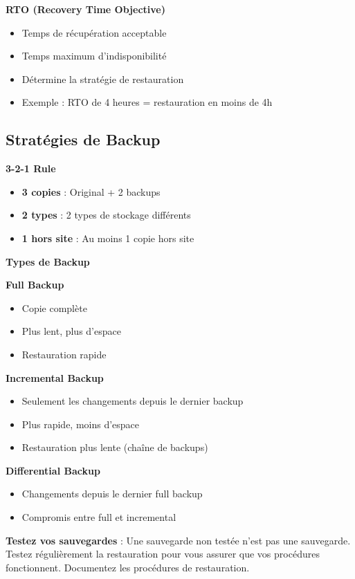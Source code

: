 \documentclass[11pt,a4paper]{article}
\begin{document}
\textbf{RTO (Recovery Time Objective)}
\begin{itemize}
    \item Temps de récupération acceptable
    \item Temps maximum d'indisponibilité
    \item Détermine la stratégie de restauration
    \item Exemple : RTO de 4 heures = restauration en moins de 4h
\end{itemize}

\subsection{Stratégies de Backup}

\textbf{3-2-1 Rule}
\begin{itemize}
    \item \textbf{3 copies} : Original + 2 backups
    \item \textbf{2 types} : 2 types de stockage différents
    \item \textbf{1 hors site} : Au moins 1 copie hors site
\end{itemize}

\textbf{Types de Backup}

\textbf{Full Backup}
\begin{itemize}
    \item Copie complète
    \item Plus lent, plus d'espace
    \item Restauration rapide
\end{itemize}

\textbf{Incremental Backup}
\begin{itemize}
    \item Seulement les changements depuis le dernier backup
    \item Plus rapide, moins d'espace
    \item Restauration plus lente (chaîne de backups)
\end{itemize}

\textbf{Differential Backup}
\begin{itemize}
    \item Changements depuis le dernier full backup
    \item Compromis entre full et incremental
\end{itemize}

\begin{importantbox}
\textbf{Testez vos sauvegardes} : Une sauvegarde non testée n'est pas une sauvegarde. Testez régulièrement la restauration pour vous assurer que vos procédures fonctionnent. Documentez les procédures de restauration.
\end{importantbox}
\end{document}
